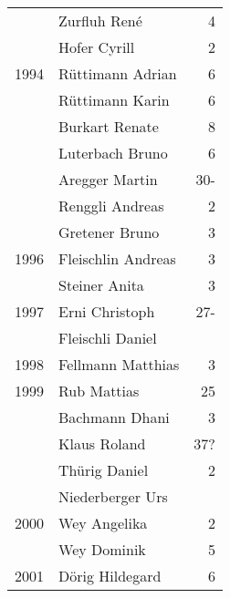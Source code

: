 {\begin{longtable}{ l l r }
                      & Zurfluh René                              & 4           \\
                      & Hofer Cyrill                              & 2           \\
        1994          & Rüttimann Adrian                          & 6           \\
                      & Rüttimann Karin                           & 6           \\
                      & Burkart Renate                            & 8           \\
                      & Luterbach Bruno                           & 6           \\
                      & Aregger Martin                            & 30-         \\
                      & Renggli Andreas                           & 2           \\
                      & Gretener Bruno                            & 3           \\
        1996          & Fleischlin Andreas                        & 3           \\
                      & Steiner Anita                             & 3           \\
        1997          & Erni Christoph                            & 27-         \\
                      & Fleischli Daniel                          &             \\
        1998          & Fellmann Matthias                         & 3           \\
        1999          & Rub Mattias                               & 25          \\
                      & Bachmann Dhani                            & 3           \\
                      & Klaus Roland                              & 37?         \\
                      & Thürig Daniel                             & 2           \\
                      & Niederberger Urs                          &             \\
        2000          & Wey Angelika                              & 2           \\
                      & Wey Dominik                               & 5           \\
        2001          & Dörig Hildegard                           & 6           \\

\end{longtable}}
